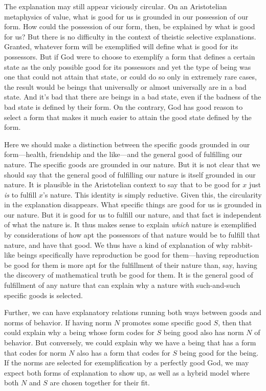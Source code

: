 The explanation may still appear viciously circular. On an Aristotelian metaphysics of value, what is good for us
is grounded in our possession of our form. How could the possession of our form, then, be explained by what is good 
for us? But there is no difficulty in the context of theistic selective explanations. Granted, whatever 
form will be exemplified will define what is good for its possessors. But if God were to choose to exemplify a form
that defines a certain state as the only possible good for its possessors and yet the type of being was one that
could not attain that state, or could do so only in extremely rare cases, the result would be beings 
that universally or almost universally are in a bad state. And it's bad that there are beings in a bad state,
even if the badness of the bad state is defined by their form. On the contrary, God has good reason to select a 
form that makes it much easier to attain the good state defined by the form.

Here we should make a distinction between the specific goods grounded in our form---health, friendship and the like---and
the general good of fulfilling our nature. The specific goods are grounded in our nature. But it is not clear that we should say that 
the general good of fulfilling our nature is itself grounded in our nature. It is plausible in the Aristotelian context to say that 
to be good for $x$ just \textit{is} to fulfill $x$'s nature. This identity is simply reductive. Given this, the circularity
in the explanation disappears. What specific things are good for us is grounded in our nature. But it is good for us to fulfill
our nature, and that fact is independent of what the nature is. It thus makes sense to explain \textit{which} nature is 
exemplified by considerations of how apt the possessors of that nature would be to fulfill that nature, and have that good.
We thus have a kind of explanation of why rabbit-like beings specifically have reproduction be good for them---having reproduction
be good for them is more apt for the fulfillment of their nature than, say, having the discovery of mathematical truth be good
for them. It is the general good of fulfillment of any nature that can explain why a nature with such-and-such specific goods is
selected.

Further, we can have explanatory relations running both ways between goods and norms of behavior. If having norm $N$ promotes
some specific good $S$, then that could explain why a being whose form codes for $S$ being good also has norm $N$ of behavior.
But conversely, we could explain why we have a being that has a form that codes for norm $N$ also has a form
that codes for $S$ being good for the being. 
If the norms are selected for exemplification by a perfectly good God, we may expect both forms of explanation to show up,
as well as a hybrid model where both $N$ and $S$ are chosen together for their fit.

